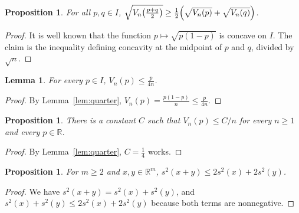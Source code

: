 \documentclass[11pt]{article}
\newtheorem{lemma}[theorem]{Lemma}
\newtheorem{proposition}[theorem]{Proposition}
\theoremstyle{definition}
\begin{document}
\begin{proposition}\label{prop:concave}
For all $p, q \in I$,
$\sqrt{V_n\bigl(\tfrac{p+q}{2}\bigr)} \ge \frac12 \Bigl(\sqrt{V_n(p)} + \sqrt{V_n(q)}\Bigr)$.
\end{proposition}

\begin{proof}
It is well known that the function $p \mapsto \sqrt{p(1-p)}$ is concave on $I$. The claim is the inequality defining
concavity at the midpoint of $p$ and $q$, divided by $\sqrt{n}$.
\end{proof}

\begin{lemma}\label{lem:linear}
For every $p \in I$, $V_n(p) \le \frac{p}{4n}$.
\end{lemma}

\begin{proof}
By Lemma~\ref{lem:quarter}, $V_n(p) = \frac{p(1-p)}{n} \le \frac{p}{4n}$.
\end{proof}

\begin{proposition}\label{prop:uniform}
There is a constant $C$ such that $V_n(p) \le C/n$ for every $n \ge 1$ and every $p \in \mathbb{R}$.
\end{proposition}

\begin{proof}
By Lemma~\ref{lem:quarter}, $C = \frac14$ works.
\end{proof}

\begin{proposition}\label{prop:sum}
For $m \ge 2$ and $x, y \in \mathbb{R}^m$, $s^2(x + y) \le 2 s^2(x) + 2 s^2(y)$.
\end{proposition}

\begin{proof}
We have $s^2(x + y) = s^2(x) + s^2(y)$, and $s^2(x) + s^2(y) \le 2 s^2(x) + 2 s^2(y)$ because both terms are
nonnegative.
\end{proof}
\end{document}
